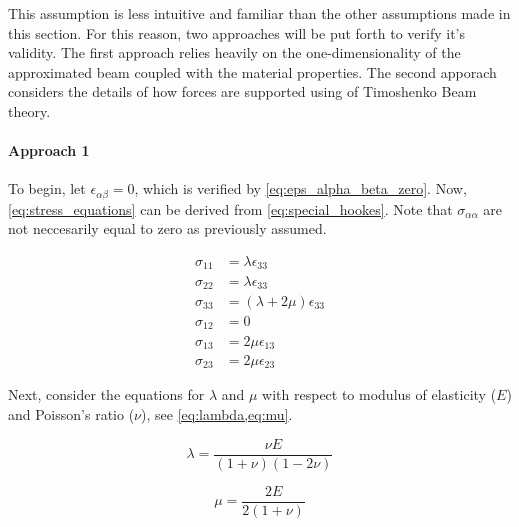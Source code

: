 This assumption is less intuitive and familiar than the other assumptions made in this section.
For this reason, two approaches will be put forth to verify it's validity.
The first approach relies heavily on the one-dimensionality of the approximated beam coupled with the material properties.
The second apporach considers the details of how forces are supported using of Timoshenko Beam theory. 



\paragraph{Approach 1}
To begin, let $\epsilon_{\alpha\beta} = 0$, which is verified by \cref{eq:eps_alpha_beta_zero}.
Now, \cref{eq:stress_equations} can be derived from \cref{eq:special_hookes}.
Note that $\sigma_{\alpha\alpha}$ are not neccesarily equal to zero as previously assumed. 

\begin{align}
\sigma_{11} &= \lambda\epsilon_{33} \nonumber \\
\sigma_{22} &= \lambda\epsilon_{33} \nonumber \\
\sigma_{33} &= (\lambda+2\mu)\epsilon_{33} \nonumber \\
\sigma_{12} &= 0 \nonumber \\
\sigma_{13} &= 2\mu\epsilon_{13} \nonumber \\
\sigma_{23} &= 2\mu\epsilon_{23}
\label{eq:stress_equations}
\end{align}

Next, consider the equations for $\lambda$ and $\mu$ with respect to modulus of elasticity ($E$) and Poisson's ratio ($\nu$), see \cref{eq:lambda,eq:mu}.

\begin{equation}
\lambda = \frac{\nu E}{(1+\nu)(1-2\nu)}
\label{eq:lambda}
\end{equation}

\begin{equation}
\mu =  \frac{2E}{2(1+\nu)}
\label{eq:mu}
\end{equation}

